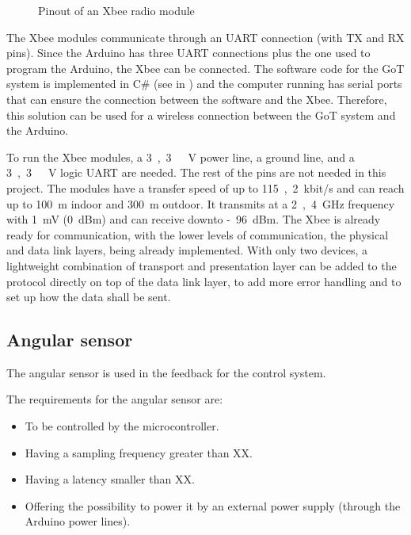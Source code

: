 \begin{minipage}{\linewidth}
\begin{minipage}{0.45\linewidth}
\begin{figure}[H]
			\caption{Pinout of an Xbee radio module} 
			\label{Xbeepinout}
		\end{figure}
	\end{minipage}
\end{minipage}


The Xbee modules communicate through an UART connection (with TX and RX pins). Since the Arduino has three UART connections plus the one used to program the Arduino, the Xbee can be connected. The software code for the GoT system is implemented in C\# (see in ) and the computer running has serial ports that can ensure the connection between the software and the Xbee. Therefore, this solution can be used for a wireless connection between the GoT system and the Arduino.

To run the Xbee modules, a \si{3,3\ V} power line, a ground line, and a \si{3,3\ V} logic UART are needed. The rest of the pins are not needed in this project. The modules have a transfer speed of up to \si{115,2 kbit/s} and can reach up to \si{100 m} indoor and \si{300 m} outdoor. It transmits at a \si{2,4 GHz} frequency with \si{1 mV} (\si{0 dBm}) and can receive downto \si{-96 dBm}. The Xbee is already ready for communication, with the lower levels of communication, the physical and data link layers, being already implemented. With only two devices, a lightweight combination of transport and presentation layer can be added to the protocol directly on top of the data link layer, to add more error handling and to set up how the data shall be sent.



\subsection{Angular sensor}
The angular sensor is used in the feedback for the control system.

The requirements for the angular sensor are:
\begin{itemize}
\item To be controlled by the microcontroller.
\item Having a sampling frequency greater than XX. 
\item Having a latency smaller than XX. 
\item Offering the possibility to power it by an external power supply (through the Arduino power lines).
\end{itemize}

